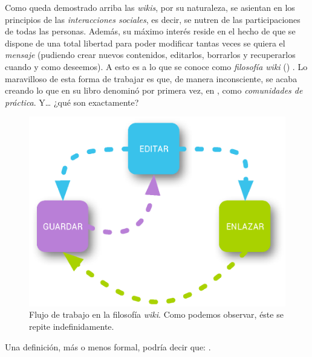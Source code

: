 Como queda demostrado arriba las \textit{wikis}, por su naturaleza, se asientan en los principios de las \textit{interacciones sociales}, es decir, se nutren de las participaciones de todas las personas. Además, su máximo interés reside en el hecho de que se dispone de una total libertad para poder modificar tantas veces se quiera el \textit{mensaje} (pudiendo crear nuevos contenidos, editarlos, borrarlos y recuperarlos cuando y como deseemos). A esto es a lo que se conoce como \textit{filosofía wiki} () \cite{video:wikis-plain-english}. Lo maravilloso de esta forma de trabajar es que, de manera inconsciente, se acaba creando lo que \citeauthor{libro:comunidades-de-practica-wenger-primera-edicion} en su libro  \cite{libro:comunidades-de-practica-wenger-primera-edicion} denominó por primera vez, en \citeyear{libro:comunidades-de-practica-wenger-primera-edicion}, como \textit{comunidades de práctica}. Y\ldots{} ¿qué son exactamente?

\begin{figure}
\centering
\includegraphics[width=\linewidth]{../graphics/fig_filosofia_wiki.eps}
\caption{Flujo de trabajo en la filosofía \textit{wiki}. Como podemos observar, éste se repite indefinidamente.}\label{fig:filosofia_wiki}
\end{figure}
 
Una definición, más o menos formal, podría decir que:  \cite{paper:filwit}.

